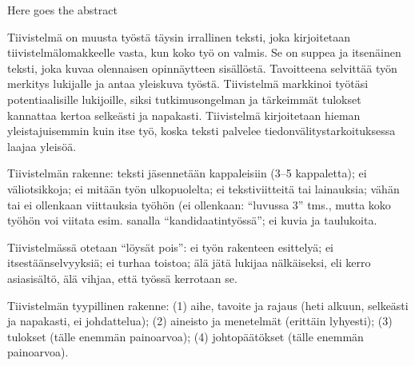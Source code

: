 %
%

\begin{enabstract}
  Here goes the abstract
  \end{enabstract}

\begin{fiabstract}
  Tiivistelmä on muusta työstä täysin irrallinen teksti, joka
  kirjoitetaan tiivistelmälomakkeelle vasta, kun koko työ on
  valmis. Se on suppea ja itsenäinen teksti, joka kuvaa olennaisen
  opinnäytteen sisällöstä. Tavoitteena selvittää työn merkitys
  lukijalle ja antaa yleiskuva työstä. Tiivistelmä markkinoi työtäsi
  potentiaalisille lukijoille, siksi tutkimusongelman ja tärkeimmät
  tulokset kannattaa kertoa selkeästi ja napakasti. Tiivistelmä
  kirjoitetaan hieman yleistajuisemmin kuin itse työ, koska teksti
  palvelee tiedonvälitystarkoituksessa laajaa yleisöä.

  Tiivistelmän rakenne: 
teksti jäsennetään kappaleisiin (3--5 kappaletta);
ei väliotsikkoja; 
ei mitään työn ulkopuolelta; 
ei tekstiviitteitä tai lainauksia;
vähän tai ei ollenkaan viittauksia työhön 
(ei ollenkaan: ``luvussa 3'' tms., mutta koko työhön voi 
viitata esim. sanalla ``kandidaatintyössä'';
ei kuvia ja taulukoita.

Tiivistelmässä otetaan ``löysät pois'':
ei työn rakenteen esittelyä;
ei itsestäänselvyyksiä;
ei turhaa toistoa;
älä jätä lukijaa nälkäiseksi, eli kerro asiasisältö, 
älä vihjaa, että työssä kerrotaan se.

Tiivistelmän tyypillinen rakenne: 
(1) aihe, tavoite ja rajaus 
(heti alkuun, selkeästi ja napakasti, ei johdattelua);
(2) aineisto ja menetelmät (erittäin lyhyesti);
(3) tulokset (tälle enemmän painoarvoa); 
(4) johtopäätökset (tälle enemmän painoarvoa).
%
\end{fiabstract}
